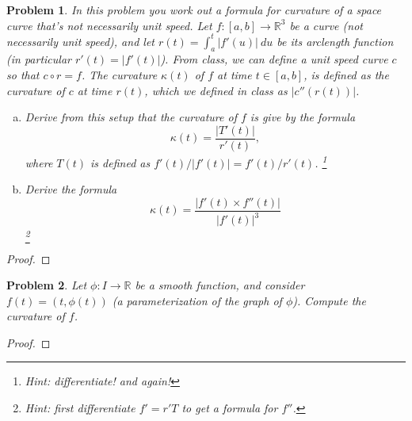 \documentclass[11pt]{article}
\newtheorem{problem}{Problem}
\begin{document}
\pagebreak

\begin{problem}
In this problem you work out a formula for curvature of a space curve that's not necessarily unit speed. Let $f:[a,b]\to\mathbb R^3$ be a curve (not necessarily unit speed), and let $r(t)=\int_a^t|f'(u)|\>du$ be its arclength function (in particular $r'(t)=|f'(t)|$). From class, we can define a unit speed curve $c$ so that $c\circ r=f$. The curvature $\kappa(t)$ of $f$ at time $t\in[a,b]$, is defined as the curvature of $c$ at time $r(t)$, which we defined in class as $|c''(r(t))|$.  
\begin{enumerate}[(a)]
\item Derive from this setup that the curvature of $f$ is give by the formula
\[\kappa(t)=\frac{|T'(t)|}{r'(t)},\]
where $T(t)$ is defined as $f'(t)/|f'(t)|= f'(t)/r'(t)$. \footnote{Hint: differentiate! and again! }
\item Derive the formula 
\[\kappa(t)=\frac{|f'(t)\times f''(t)|}{|f'(t)|^3}
\]\footnote{Hint: first differentiate $f'=r'T$ to get a formula for $f''$.}
\end{enumerate} 
\end{problem}

\begin{proof}

\end{proof}

\pagebreak

\begin{problem}
Let $\phi:I\to\mathbb R$ be a smooth function, and consider $f(t)=(t,\phi(t))$ (a parameterization of the graph of $\phi$). Compute the curvature of $f$. 
\end{problem}

\begin{proof}

\end{proof}

\pagebreak
\end{document}
